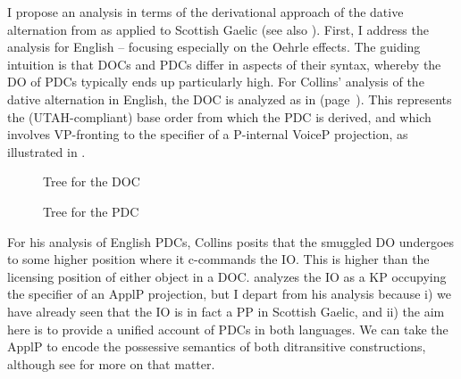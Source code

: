 \documentclass[output=paper,colorlinks,citecolor=brown]{langscibook}
\begin{document}
I propose an analysis in terms of the derivational approach of the dative alternation from \citet{gt:Collins:2023} as applied to Scottish Gaelic (see also \citealt{gt:Thoms:2024p}). First, I address the analysis for English -- focusing especially on the Oehrle effects. The guiding intuition is that DOCs and PDCs differ in aspects of their  syntax, whereby the DO of PDCs typically ends up particularly high. For Collins' analysis of the dative alternation in English, the DOC is analyzed as in  (page~\pageref{ssa}). This represents the (UTAH\hyp compliant) base order from which the PDC is derived, and which involves VP-fronting to the specifier of a P-internal VoiceP projection, as illustrated in .

\begin{figure}
\caption{Tree for the DOC}
\label{ssa}
\end{figure}

\begin{figure}
\caption{Tree for the PDC}
\label{hgy}
\end{figure}

For his analysis of English PDCs, Collins posits that the smuggled DO undergoes  to some higher position where it c-commands the IO. This is higher than the licensing position of either object in a DOC. \citet{gt:Collins:2023} analyzes the IO as a KP occupying the specifier of an ApplP projection, but I depart from his analysis because i) we have already seen that the IO is in fact a PP in Scottish Gaelic, and ii) the aim here is to provide a unified account of PDCs in both languages. We can take the ApplP to encode the possessive semantics of both ditransitive constructions, although see \citet{gt:Thoms:2024p} for more on that matter. 
\end{document}
